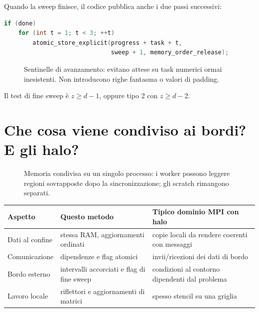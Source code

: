 \documentclass[11pt,a4paper]{article}
\newcommand{\page}[1]{\clearpage\section{#1}}
\begin{document}
Quando la sweep finisce, il codice pubblica anche i due passi successivi:
\begin{lstlisting}[language=C]
if (done)
    for (int t = 1; t < 3; ++t)
        atomic_store_explicit(progress + task + t,
                              sweep + 1, memory_order_release);
\end{lstlisting}
\begin{figure}[H]\centering
{}
\caption{Sentinelle di avanzamento: evitano attese su task numerici ormai inesistenti. Non introducono righe fantasma o valori di padding.}
\end{figure}
Il test di fine sweep è $z\ge d-1$, oppure tipo 2 con $z\ge d-2$.
\page{Che cosa viene condiviso ai bordi? E gli halo?}
\begin{figure}[H]\centering
{}
\caption{Memoria condivisa su un singolo processo: i worker possono leggere regioni sovrapposte dopo la sincronizzazione; gli scratch rimangono separati.}
\end{figure}
\begin{center}\small\begin{tabularx}{\linewidth}{lXX}\toprule
Aspetto&Questo metodo&Tipico dominio MPI con halo\\\midrule
Dati al confine&stessa RAM, aggiornamenti ordinati&copie locali da rendere coerenti con messaggi\\
Comunicazione&dipendenze e flag atomici&invii/ricezioni dei dati di bordo\\
Bordo esterno&intervalli accorciati e flag di fine sweep&condizioni al contorno dipendenti dal problema\\
Lavoro locale&riflettori e aggiornamenti di matrici&spesso stencil su una griglia\\\bottomrule
\end{tabularx}\end{center}
\end{document}
